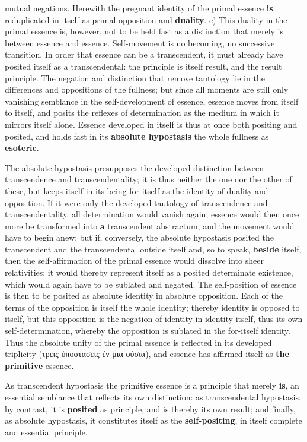 \documentclass[12pt,a4paper,openany]{book}
\newcommand{\opage}[1]{\marginnote{\footnotesize\textit{[#1]}}}
\begin{document}
\setcounter{footnote}{0}%
\opage{117}mutual negations. Herewith the pregnant identity of the primal essence \textbf{is} reduplicated in itself as primal opposition and \textbf{duality}.
c) This duality in the primal essence is, however, not to be held fast as a distinction that merely is between essence and essence. Self-movement is no becoming, no successive transition. In order that essence can be a transcendent, it must already have posited itself as a transcendental: the principle is itself result, and the result principle. The negation and distinction that remove tautology lie in the differences and oppositions of the fullness; but since all moments are still only vanishing semblance in the self-development of essence, essence moves from itself to itself, and posits the reflexes of determination as the medium in which it mirrors itself alone. Essence developed in itself is thus at once both positing and posited, and holds fast in its \textbf{absolute hypostasis} the whole fullness as \textbf{esoteric}.

The absolute hypostasis presupposes the developed distinction between transcendence and transcendentality; it is thus neither the one nor the other of these, but keeps itself in its being-for-itself as the identity of duality and opposition. If it were only the developed tautology of transcendence and transcendentality, all determination would vanish again; essence would then once more be transformed into \textbf{a} transcendent abstractum, and the movement would have to begin anew; but if, conversely, the absolute hypostasis posited the transcendent and the transcendental outside itself and, so to speak, \textbf{beside} itself, then the self-affirmation of the primal essence would dissolve into sheer relativities; it would thereby
\setcounter{footnote}{0}%
\opage{118}represent itself as a posited determinate existence, which would again have to be sublated and negated. The self-position of essence is then to be posited as absolute identity in absolute opposition. Each of the terms of the opposition is itself the whole identity; thereby identity is opposed to itself, but this opposition is the negation of identity in identity itself, thus its own self-determination, whereby the opposition is sublated in the for-itself identity. Thus the absolute unity of the primal essence is reflected in its developed triplicity (τρεις ὑποστασεις ἐν μια οὐσια), and essence has affirmed itself as \textbf{the primitive} essence.

As transcendent hypostasis the primitive essence is a principle that merely \textbf{is}, an essential semblance that reflects its own distinction: as transcendental hypostasis, by contrast, it is \textbf{posited} as principle, and is thereby its own result; and finally, as absolute hypostasis, it constitutes itself as the \textbf{self-positing}, in itself complete and essential principle.
\end{document}
